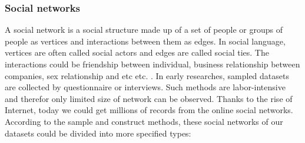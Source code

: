 \documentclass[symmetry,article,submit,moreauthors,pdftex,10pt,a4paper]{Definitions/mdpi}
\makeatletter
\newcommand*{\etc}{%
    \@ifnextchar{.}%
        {etc}%
        {etc.\@\xspace}%
}
\makeatother
\begin{document}
\subsubsection{Social networks}
A social network is a social structure made up of a set of people or groups of people as vertices and interactions between them as edges. In social language, vertices are often called social actors and edges are called social ties. The interactions could be friendship between individual, business relationship between companies, sex relationship and \etc. In early researches, sampled datasets are collected by questionnaire or interviews. Such methods are labor-intensive and therefor only limited size of network can be observed. Thanks to the rise of Internet, today we could get millions of records from the online social networks. According to the sample and construct methods, these social networks of our datasets could be divided into more specified types:
\end{document}
